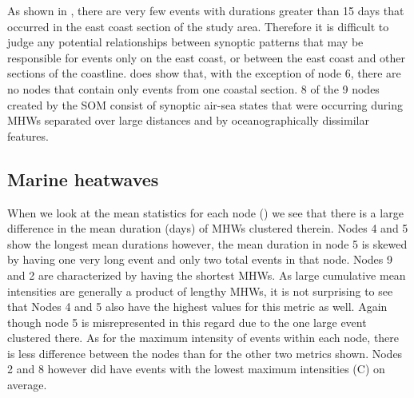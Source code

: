 \documentclass[a4paper,10pt,review]{elsarticle}
\begin{document}
As shown in , there are very few events with durations greater than 15 days that occurred in the east coast section of the study area. Therefore it is difficult to judge any potential relationships between synoptic patterns that may be responsible for events only on the east coast, or between the east coast and other sections of the coastline.  does show that, with the exception of node 6, there are no nodes that contain only events from one coastal section. 8 of the 9 nodes created by the SOM consist of synoptic air-sea states that were occurring during MHWs separated over large distances and by oceanographically dissimilar features.

\subsection{Marine heatwaves}
When we look at the mean statistics for each node () we see that there is a large difference in the mean duration (days) of MHWs clustered therein. Nodes 4 and 5 show the longest mean durations however, the mean duration in node 5 is skewed by having one very long event and only two total events in that node. Nodes 9 and 2 are characterized by having the shortest MHWs. As large cumulative mean intensities are generally a product of lengthy MHWs, it is not surprising to see that Nodes 4 and 5 also have the highest values for this metric as well. Again though node 5 is misrepresented in this regard due to the one large event clustered there. As for the maximum intensity of events within each node, there is less difference between the nodes than for the other two metrics shown. Nodes 2 and 8 however did have events with the lowest maximum intensities (\degree C) on average.
\end{document}

